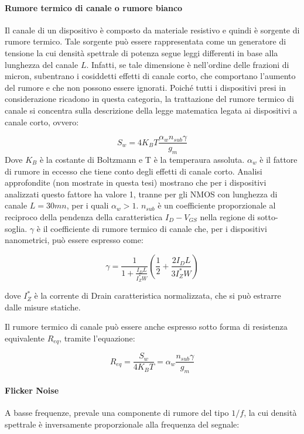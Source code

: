 \paragraph*{Rumore termico di canale o rumore bianco}
Il canale di un dispositivo è composto da materiale resistivo e quindi è sorgente di rumore termico. Tale sorgente può essere rappresentata come un generatore di tensione la cui densità spettrale di potenza segue leggi differenti in base alla lunghezza del canale $L$.  Infatti, se tale dimensione è nell'ordine delle frazioni di micron, subentrano i cosiddetti effetti di canale corto, che comportano l'aumento del rumore e che non possono essere ignorati.
Poiché tutti i dispositivi presi in considerazione ricadono in questa categoria, la trattazione del rumore termico di canale si concentra sulla descrizione della legge matematica legata ai dispositivi a canale corto, ovvero:

\begin{equation}
  S_w = 4 K_B T \frac{\alpha_w n_{sub} \gamma}{g_m}
\end{equation}
Dove $K_B$ è la costante di Boltzmann e T è la temperaura assoluta. $\alpha_w$ è il fattore di rumore in eccesso che tiene conto degli effetti di canale corto. Analisi approfondite (non mostrate in questa tesi) mostrano che per i dispositivi analizzati questo fattore ha valore 1, tranne per gli NMOS con lunghezza di canale $L = 30mn$, per i quali $\alpha_w > 1$. $n_{sub}$ è un coefficiente proporzionale al reciproco della pendenza della caratteristica $I_D-V_{GS}$ nella regione di sotto-soglia. $\gamma$ è il coefficiente di rumore termico di canale che, per i dispositivi nanometrici, può essere espresso come:

\begin{equation}
  \gamma = \frac{1}{1 +  \frac {I_D L}{I_Z^* W}}\left(\frac{1}{2} + \frac{ 2 I_D L}{3 I_Z^* W}\right)
\end{equation}

dove $I_Z^*$ è la corrente di Drain caratteristica normalizzata, che si può estrarre dalle misure statiche.

Il rumore termico di canale può essere anche espresso sotto forma di resistenza equivalente $R_{eq}$, tramite l'equazione:

\begin{equation}
  R_{eq} = \frac{S_w}{4 K_B T} = \alpha_w \frac{n_{sub} \gamma}{g_m}
\end{equation}

\paragraph*{Flicker Noise}
A basse frequenze, prevale una componente di rumore del tipo $1/f$, la cui densità spettrale è inversamente proporzionale alla frequenza del segnale:

